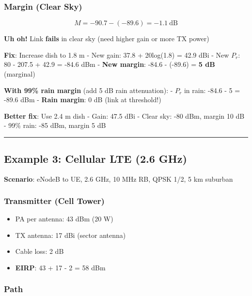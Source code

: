 \subsubsection{Margin (Clear Sky)}\label{margin-clear-sky}

\[
M = -90.7 - (-89.6) = -1.1\ \text{dB}
\]

\textbf{Uh oh!} Link \textbf{fails} in clear sky (need higher gain or
more TX power)

\textbf{Fix}: Increase dish to 1.8 m - New gain: 37.8 + 20log(1.8) =
42.9 dBi - New \(P_r\): 80 - 207.5 + 42.9 = -84.6 dBm - \textbf{New
margin}: -84.6 - (-89.6) = \textbf{5 dB} (marginal)

\textbf{With 99\% rain margin} (add 5 dB rain attenuation): - \(P_r\) in
rain: -84.6 - 5 = -89.6 dBm - \textbf{Rain margin}: 0 dB (link at
threshold!)

\textbf{Better fix}: Use 2.4 m dish - Gain: 47.5 dBi - Clear sky: -80
dBm, margin 10 dB - 99\% rain: -85 dBm, margin 5 dB

\begin{center}\rule{0.5\linewidth}{0.5pt}\end{center}

\subsection{Example 3: Cellular LTE (2.6
GHz)}\label{example-3-cellular-lte-2.6-ghz}

\textbf{Scenario}: eNodeB to UE, 2.6 GHz, 10 MHz RB, QPSK 1/2, 5 km
suburban

\subsubsection{Transmitter (Cell Tower)}\label{transmitter-cell-tower}

\begin{itemize}
\tightlist
\item
  PA per antenna: 43 dBm (20 W)
\item
  TX antenna: 17 dBi (sector antenna)
\item
  Cable loss: 2 dB
\item
  \textbf{EIRP}: 43 + 17 - 2 = 58 dBm
\end{itemize}

\subsubsection{Path}\label{path-2}

